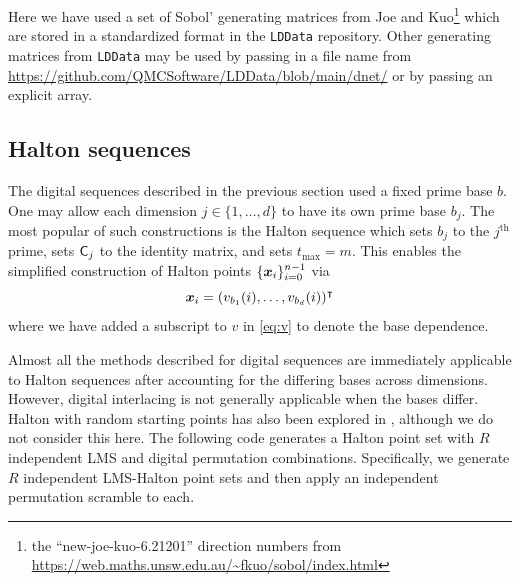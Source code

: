 \documentclass[acmsmall]{acmart}
\begin{document}
\begin{listing}[H]
    \inputminted{python}{snippets/dnb2.txt}
    \caption{Generate randomized higher-order digital nets.}
    \label{code:dnb2}
\end{listing}

\noindent Here we have used a set of Sobol' generating matrices from Joe and Kuo\footnote{the ``new-joe-kuo-6.21201'' direction numbers from \url{https://web.maths.unsw.edu.au/~fkuo/sobol/index.html}} \citep{joe2008constructing} which are stored in a standardized format in the \texttt{LDData} repository. Other generating matrices from \texttt{LDData} may be used by passing in a file name from \url{https://github.com/QMCSoftware/LDData/blob/main/dnet/} or by passing an explicit array. 

\subsection{Halton sequences}

The digital sequences described in the previous section used a fixed prime base $b$. One may allow each dimension $j \in \{1,\dots,d\}$ to have its own prime base $b_j$. The most popular of such constructions is the Halton sequence which sets $b_j$ to the $j^\mathrm{th}$ prime, sets ${\mathsf{C}}_j$ to the identity matrix, and sets $t_\mathrm{max} = m$. This enables the simplified construction of Halton points $\{{\boldsymbol{x}}_i\}_{i=0}^{n-1}$ via
$${\boldsymbol{x}}_i = (v_{b_1}(i),\dots,v_{b_d}(i))^\intercal$$
where we have added a subscript to $v$ in \eqref{eq:v} to denote the base dependence. 

Almost all the methods described for digital sequences are immediately applicable to Halton sequences after accounting for the differing bases across dimensions. However, digital interlacing is not generally applicable when the bases differ. Halton with random starting points has also been explored in \citep{wang2000randomized}, although we do not consider this here.
The following code generates a Halton point set with $R$ independent LMS and digital permutation combinations. Specifically, we generate $R$ independent LMS-Halton point sets and then apply an independent permutation scramble to each.
\end{document}
